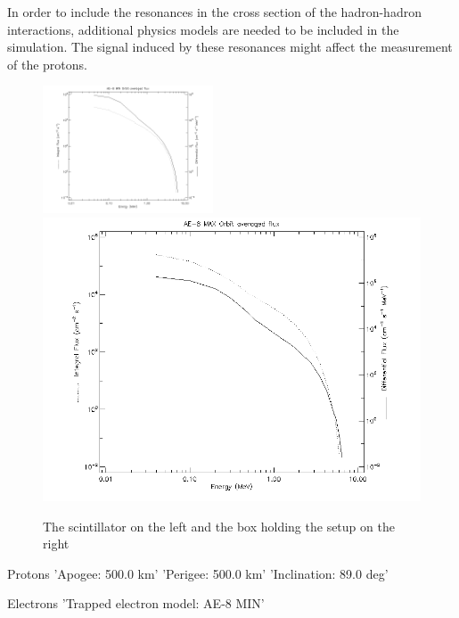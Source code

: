 \documentclass[12pt, a4paper,titlepage]{article}
\numberwithin{equation}{section}
\numberwithin{figure}{section}
\begin{document}
In order to include the resonances in the cross section of the hadron-hadron interactions, additional physics models are needed to be included in the simulation. The signal induced by these resonances might affect the measurement of the protons.


\begin{figure}[htbp]
 \centering %
 \includegraphics[width=0.45\textwidth,origin=c,angle=0]{images/alt_600km_AE-8_MIN_averaged_spectra.png}
 \qquad
 \includegraphics[width=.45\textwidth,origin=c]{images/alt_600km_AE-8_MAX_averaged_spectra.png} 
 \caption{\label{fig:i} The scintillator on the left and the box holding the setup on the right}
 \end{figure}


Protons
'Apogee: 500.0 km'
'Perigee: 500.0 km'
'Inclination: 89.0 deg'

Electrons
'Trapped electron model: AE-8 MIN'
\end{document}
